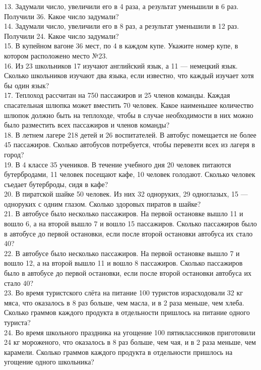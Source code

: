 13. Задумали число, увеличили его в 4 раза, а результат уменьшили в 6 раз. Получили 36. Какое число задумали?\\
14. Задумали число, увеличили его в 8 раз, а результат уменьшили в 12 раз. Получили 24. Какое число задумали?\\
15. В купейном вагоне 36 мест, по 4 в каждом купе. Укажите номер купе, в котором расположено место №23.\\
16. Из 23 школьников 17 изучают английский язык, а 11 --- немецкий язык. Сколько школьников изучают два языка, если известно, что каждый изучает хотя бы один язык?\\
17. Теплоход рассчитан на 750 пассажиров и 25 членов команды. Каждая спасательная шлюпка может вместить 70 человек. Какое наименьшее количество шлюпок должно быть на теплоходе, чтобы в случае необходимости в них можно было разместить всех пассажиров и членов команды?\\
18. В летнем лагере 218 детей и 26 воспитателей. В автобус помещается не более 45 пассажиров. Сколько автобусов потребуется, чтобы перевезти всех из лагеря в город?\\
19. В 4 классе 35 учеников. В течение учебного дня 20 человек питаются бутербродами, 11 человек посещают кафе, 10 человек голодают. Сколько человек съедает бутерброды, сидя в кафе?\\
20. В пиратской шайке 50 человек. Из них 32 одноруких, 29 одноглазых, 15 --- одноруких с одним глазом. Сколько здоровых пиратов в шайке?\\
21. В автобусе было несколько пассажиров. На первой остановке вышло 11 и вошло 6, а на второй вышло 7 и вошло 15 пассажиров. Сколько пассажиров было в автобусе до первой остановки, если после второй остановки автобуса их стало 40?\\
22. В автобусе было несколько пассажиров. На первой остановке вышло 7 и вошло 12, а на второй вышло 11 и вошло 8 пассажиров. Сколько пассажиров было в автобусе до первой остановки, если после второй остановки автобуса их стало 40?\\
23. Во время туристского слёта на питание 100 туристов израсходовали 32 кг мяса, что оказалось в 8 раз больше, чем масла, и в 2 раза меньше, чем хлеба. Сколько граммов каждого продукта в отдельности пришлось на питание одного туриста?\\
24. Во время школьного праздника на угощение 100 пятиклассников приготовили 24 кг мороженого, что оказалось в 8 раз больше, чем чая, и в 2 раза меньше, чем карамели. Сколько граммов каждого продукта в отдельности пришлось на угощение одного школьника?\\

